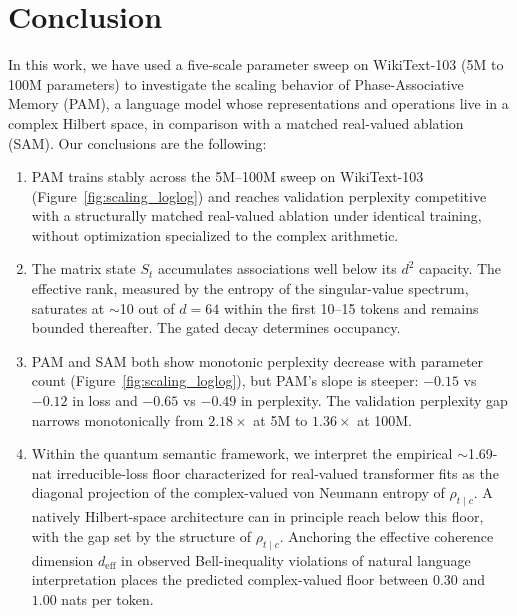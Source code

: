 \documentclass[aps,prl,twocolumn,superscriptaddress,amsmath,amssymb]{revtex4-2}
\begin{document}
\section{Conclusion}

In this work, we have used a five-scale parameter sweep on WikiText-103 (5M to 100M parameters) to investigate the scaling behavior of Phase-Associative Memory (PAM), a language model whose representations and operations live in a complex Hilbert space, in comparison with a matched real-valued ablation (SAM). Our conclusions are the following:

\begin{enumerate}

\item PAM trains stably across the 5M--100M sweep on WikiText-103 (Figure~\ref{fig:scaling_loglog}) and reaches validation perplexity competitive with a structurally matched real-valued ablation under identical training, without optimization specialized to the complex arithmetic.

\item The matrix state $S_t$ accumulates associations well below its $d^2$ capacity. The effective rank, measured by the entropy of the singular-value spectrum, saturates at $\sim$10 out of $d = 64$ within the first 10--15 tokens and remains bounded thereafter. The gated decay determines occupancy.

\item PAM and SAM both show monotonic perplexity decrease with parameter count (Figure~\ref{fig:scaling_loglog}), but PAM's slope is steeper: $-0.15$ vs $-0.12$ in loss and $-0.65$ vs $-0.49$ in perplexity. The validation perplexity gap narrows monotonically from $2.18\times$ at 5M to $1.36\times$ at 100M.

\item Within the quantum semantic framework, we interpret the empirical $\sim$1.69-nat irreducible-loss floor characterized for real-valued transformer fits as the diagonal projection of the complex-valued von Neumann entropy of $\rho_{t \mid c}$. A natively Hilbert-space architecture can in principle reach below this floor, with the gap set by the structure of $\rho_{t \mid c}$. Anchoring the effective coherence dimension $d_{\text{eff}}$ in observed Bell-inequality violations of natural language interpretation places the predicted complex-valued floor between $0.30$ and $1.00$ nats per token.

\end{enumerate}


\end{document}
